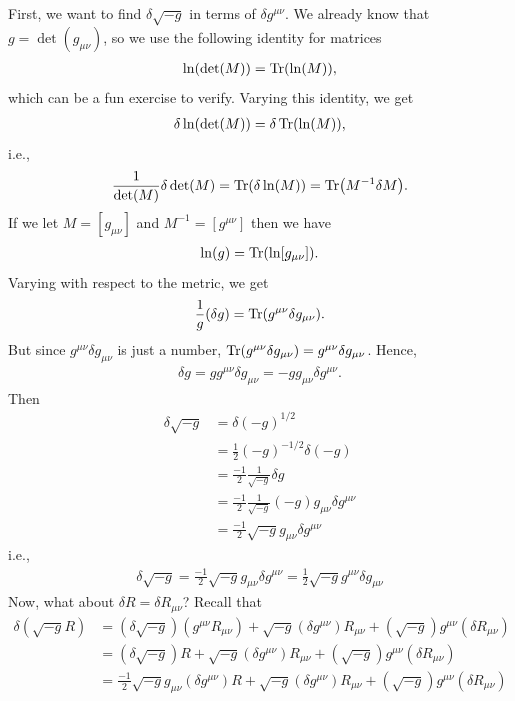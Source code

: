 \documentclass{book}
\numberwithin{equation}{section}
\theoremstyle{definition}
\newcommand{\nn}{\nonumber}
\newcommand{\f}[2]{\frac{#1}{#2}}
\begin{document}
First, we want to find $\delta \sqrt{-g}$ in terms of $\delta g^{\mu\nu}$. We already know that $g = \det(g_{\mu\nu})$, so we use the following identity for matrices
\begin{align}
\ln(\det(M)) = \Tr(\ln(M)),
\end{align}
which can be a fun exercise to verify. Varying this identity, we get
\begin{align}
\delta \ln(\det(M)) = \delta \Tr(\ln(M)),
\end{align}
i.e.,
\begin{align}
\f{1}{\det(M)}\delta \det(M) = \Tr(\delta \ln(M)) = \Tr(M^{-1}\delta M).
\end{align}
If we let $M = [g_{\mu\nu}]$ and $M^{-1} = [g^{\mu\nu}]$ then we have
\begin{align}
\ln(g) = \Tr(\ln[g_{\mu\nu}]).
\end{align}
Varying with respect to the metric, we get
\begin{align}
\f{1}{g}(\delta g) = \Tr(g^{\mu\nu}\delta g_{\mu\nu}).
\end{align}
But since $g^{\mu\nu}\delta g_{\mu\nu}$ is just a number, $\Tr(g^{\mu\nu}\delta g_{\mu\nu}) = g^{\mu\nu}\delta g_{\mu\nu}$. Hence,
\begin{align}
\boxed{\delta g = g g^{\mu\nu}\delta g_{\mu\nu} = -gg_{\mu\nu}\delta g^{\mu\nu}}.
\end{align}
Then
\begin{align}
\delta \sqrt{-g} &= \delta (-g)^{1/2\nn}\\
& = \f{1}{2}(-g)^{-1/2}\delta (-g) \nn\\
&= \f{-1}{2}\f{1}{\sqrt{-g}}\delta g \nn\\
&= \f{-1}{2}\f{1}{\sqrt{-g}}(-g)g_{\mu\nu}\delta g^{\mu\nu}\nn\\
&= \f{-1}{2}\sqrt{-g}g_{\mu\nu} \delta g^{\mu\nu}
\end{align}
i.e.,
\begin{align}
\boxed{\delta \sqrt{-g} = \f{-1}{2}\sqrt{-g}g_{\mu\nu} \delta g^{\mu\nu} = \f{1}{2}\sqrt{-g}g^{\mu\nu}\delta g_{\mu\nu}}
\end{align}
Now, what about $\delta R = \delta R_{\mu\nu}$? Recall that
\begin{align}
\delta (\sqrt{-g} R) &= (\delta \sqrt{-g})(g^{\mu\nu}R_{\mu\nu}) + \sqrt{-g}(\delta g^{\mu\nu})R_{\mu\nu} + (\sqrt{-g})g^{\mu\nu}(\delta R_{\mu\nu})\nn\\
&= (\delta \sqrt{-g})R + \sqrt{-g}(\delta g^{\mu\nu})R_{\mu\nu} + (\sqrt{-g})g^{\mu\nu}(\delta R_{\mu\nu})\nn\\
&= \f{-1}{2}\sqrt{-g}g_{\mu\nu}( \delta g^{\mu\nu})R + \sqrt{-g}(\delta g^{\mu\nu})R_{\mu\nu} + (\sqrt{-g})g^{\mu\nu}(\delta R_{\mu\nu})
\end{align} 
\end{document}
